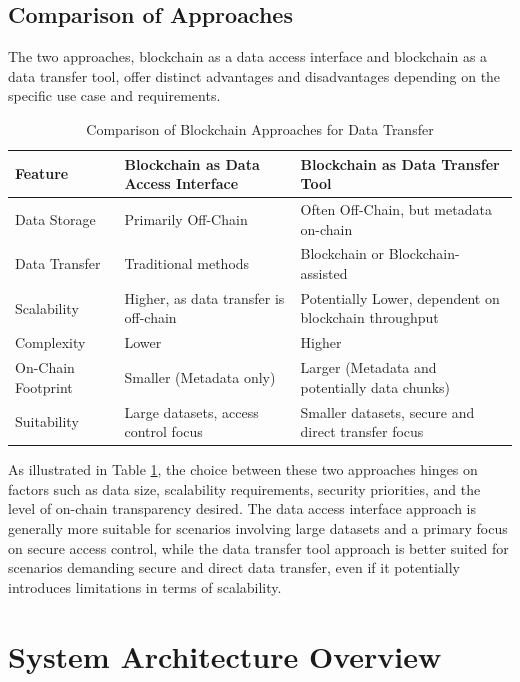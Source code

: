\documentclass[10pt]{llncs}
\begin{document}
\subsection{Comparison of Approaches}

The two approaches, blockchain as a data access interface and blockchain as a data transfer tool, offer distinct advantages and disadvantages depending on the specific use case and requirements.

\begin{table}[h!]
\caption{Comparison of Blockchain Approaches for Data Transfer}
\label{tab:comparison}
\begin{tabular}{|p{2.0cm}|p{5.0cm}|p{5.0cm}|}
\hline
Feature & Blockchain as Data Access Interface & Blockchain as Data Transfer Tool \\ \hline
Data Storage & Primarily Off-Chain & Often Off-Chain, but metadata on-chain \\ \hline
Data Transfer & Traditional methods & Blockchain or Blockchain-assisted \\ \hline
Scalability & Higher, as data transfer is off-chain & Potentially Lower, dependent on blockchain throughput \\ \hline
Complexity & Lower & Higher \\ \hline
On-Chain Footprint & Smaller (Metadata only) & Larger (Metadata and potentially data chunks) \\ \hline
Suitability & Large datasets, access control focus & Smaller datasets, secure and direct transfer focus \\ \hline
\end{tabular}

\end{table}

As illustrated in Table \ref{tab:comparison}, the choice between these two approaches hinges on factors such as data size, scalability requirements, security priorities, 
and the level of on-chain transparency desired. 
The data access interface approach is generally more suitable for scenarios involving large datasets and a primary focus on secure access control, while the data transfer tool 
approach is better suited for scenarios demanding secure and direct data transfer, even if it potentially introduces limitations in terms of scalability.

\section{System Architecture Overview} \label{architecture}
\end{document}
